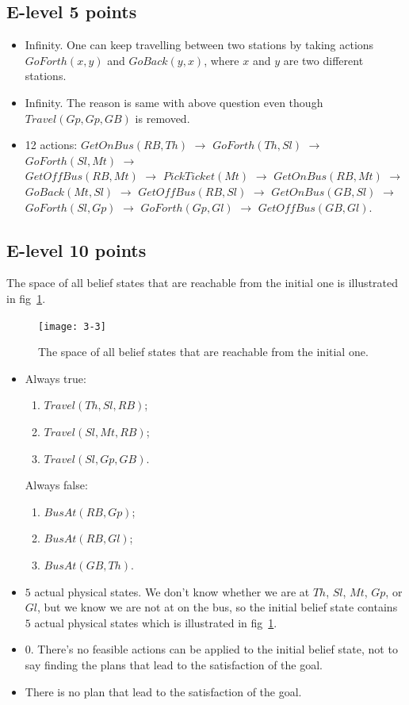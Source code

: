 \documentclass[11pt,a4paper]{article}
\begin{document}
\subsection{E-level 5 points}
\begin{itemize}
	\item Infinity. One can keep travelling between two stations by taking actions $GoForth(x, y)$ and $GoBack(y, x)$, where $x$ and $y$ are two different stations.
	\item Infinity. The reason is same with above question even though $Travel(Gp, Gp, GB)$ is removed.
	\item 12 actions: $GetOnBus(RB, Th)$ $\rightarrow$ $GoForth(Th, Sl)$ $\rightarrow$ $GoForth(Sl, Mt)$ $\rightarrow$ \\ $GetOffBus(RB, Mt)$ $\rightarrow$ $PickTicket(Mt)$ $\rightarrow$ $GetOnBus(RB, Mt)$ $\rightarrow$ $GoBack(Mt, Sl)$ $\rightarrow$ $GetOffBus(RB, Sl)$ $\rightarrow$ $GetOnBus(GB, Sl)$ $\rightarrow$ $GoForth(Sl, Gp)$ $\rightarrow$ $GoForth(Gp, Gl)$ $\rightarrow$ $GetOffBus(GB, Gl)$.
\end{itemize}

\subsection{E-level 10 points}
\label{3-3}
\par The space of all belief states that are reachable from the initial one is illustrated in fig~\ref{fig:3-3}.
\begin{figure}[!htbp]
	\footnotesize
	\centering
	\texttt{[image: 3-3]}
	\caption{The space of all belief states that are reachable from the initial one.}
	\label{fig:3-3}
\end{figure}

\begin{itemize}
	\item Always true:
		\begin{enumerate}[(1)]
			\item $Travel(Th, Sl, RB)$;
			\item $Travel(Sl, Mt, RB)$;
			\item $Travel(Sl, Gp, GB)$.
		\end{enumerate}			
		\par Always false:
		\begin{enumerate}[(1)]
			\item $BusAt(RB, Gp)$;
			\item $BusAt(RB, Gl)$;
			\item $BusAt(GB, Th)$.
		\end{enumerate}
	\item $5$ actual physical states. We don't know whether we are at $Th$, $Sl$, $Mt$, $Gp$, or $Gl$, but we know we are not at on the bus, so the initial belief state contains $5$ actual physical states which is illustrated in fig~\ref{fig:3-3}.
	\item $0$. There's no feasible actions can be applied to the initial belief state, not to say finding the plans that lead to the satisfaction of the goal.
	\item There is no plan that lead to the satisfaction of the goal.
\end{itemize}
\end{document}
